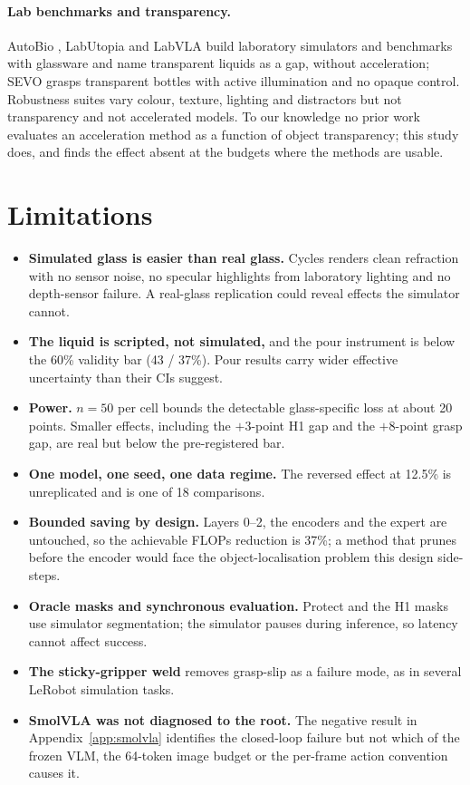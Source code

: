 \documentclass[11pt]{article}
\begin{document}
\paragraph{Lab benchmarks and transparency.} AutoBio \citep{lan2025autobio}, LabUtopia \citep{li2025labutopia} and LabVLA \citep{ren2026labvla} build laboratory simulators and benchmarks with glassware and name transparent liquids as a gap, without acceleration; SEVO \citep{fang2026sevo} grasps transparent bottles with active illumination and no opaque control. Robustness suites \citep{morgan2026colosseum,fei2025liberoplus} vary colour, texture, lighting and distractors but not transparency and not accelerated models. To our knowledge no prior work evaluates an acceleration method as a function of object transparency; this study does, and finds the effect absent at the budgets where the methods are usable.

\section{Limitations}
\label{sec:limitations}

\begin{itemize}
\item \textbf{Simulated glass is easier than real glass.} Cycles renders clean refraction with no sensor noise, no specular highlights from laboratory lighting and no depth-sensor failure. A real-glass replication could reveal effects the simulator cannot.
\item \textbf{The liquid is scripted, not simulated,} and the pour instrument is below the 60\% validity bar (43 / 37\%). Pour results carry wider effective uncertainty than their CIs suggest.
\item \textbf{Power.} $n{=}50$ per cell bounds the detectable glass-specific loss at about 20 points. Smaller effects, including the $+3$-point H1 gap and the $+8$-point grasp gap, are real but below the pre-registered bar.
\item \textbf{One model, one seed, one data regime.} The reversed effect at 12.5\% is unreplicated and is one of 18 comparisons.
\item \textbf{Bounded saving by design.} Layers 0--2, the encoders and the expert are untouched, so the achievable FLOPs reduction is 37\%; a method that prunes before the encoder would face the object-localisation problem this design side-steps.
\item \textbf{Oracle masks and synchronous evaluation.} Protect and the H1 masks use simulator segmentation; the simulator pauses during inference, so latency cannot affect success.
\item \textbf{The sticky-gripper weld} removes grasp-slip as a failure mode, as in several LeRobot simulation tasks.
\item \textbf{SmolVLA was not diagnosed to the root.} The negative result in Appendix~\ref{app:smolvla} identifies the closed-loop failure but not which of the frozen VLM, the 64-token image budget or the per-frame action convention causes it.
\end{itemize}
\end{document}
